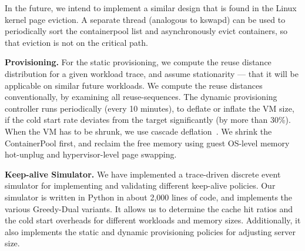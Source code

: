 In the future, we intend to implement a similar design that is found in the Linux kernel page eviction. A separate thread (analogous to kswapd) can be used to periodically sort the containerpool list and asynchronously evict containers, so that eviction is not on the critical path. 





\noindent \textbf{Provisioning.}
For the static provisioning, we compute the reuse distance distribution for a given workload trace, and assume stationarity --- that it will be applicable on similar future workloads. 
We compute the reuse distances conventionally, by examining all reuse-sequences.
The dynamic provisioning controller runs periodically (every 10 minutes), to deflate or inflate the VM size, if the cold start rate deviates from the target significantly (by more than 30\%).
When the VM has to be shrunk, we use cascade deflation~\cite{deflation-eurosys19}.
We shrink the ContainerPool first, and reclaim the free memory using guest OS-level memory hot-unplug and hypervisor-level page swapping. 



\noindent \textbf{Keep-alive Simulator.}
We have implemented a trace-driven discrete event simulator for implementing and validating different keep-alive policies.
Our simulator is written in Python in about 2,000 lines of code, and implements the various Greedy-Dual variants. 
It allows us to determine the cache hit ratios and the cold start overheads for different workloads and memory sizes.
Additionally, it also implements the static and dynamic provisioning policies for adjusting server size.

